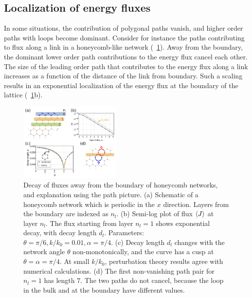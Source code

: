 \documentclass[
 preprint,
 preprintnumbers,
 amsmath,amssymb,
 aps,
 pre,
 longbibliography,
 superscriptaddress,
 10pt, twocolumn
]{revtex4-1}
\begin{document}
\subsection{Localization of energy fluxes}
In some situations, the contribution of polygonal paths vanish, and higher order paths with loops become dominant. Consider for instance the paths contributing to flux along a link in a honeycomb-like network (\figurename~\ref{fig:path_decay}). Away from the boundary, the dominant lower order path contributions to the energy flux cancel each other. The size of the leading order path that contributes to the energy flux along a link increases as a function of the distance of the link from boundary. Such a scaling results in an exponential localization of the energy flux at the boundary of the lattice (\figurename~\ref{fig:path_decay}b). 
\begin{figure}[ht]
	\centering
	\includegraphics[width=0.45\textwidth]{5_path_decay.pdf}
    \caption{Decay of fluxes away from the boundary of honeycomb networks, and explanation using the path picture.
    (a) Schematic of a honeycomb network which is periodic in the $x$ direction. Layers from the boundary are indexed as $n_l$.
    (b) Semi-log plot of flux $\expval{J}$ at layer $n_l$. The flux starting from layer $n_l=1$ shows exponential decay, with decay length $d_l$. Parameters: $\theta = \pi/6, k/k_0 = 0.01, \alpha = \pi/4$.
    (c) Decay length $d_l$ changes with the network angle $\theta$ non-monotonically, and the curve has a cusp at $\theta = \alpha = \pi/4$. At small $k/k_0$, perturbation theory results agree with numerical calculations.
    (d) The first non-vanishing path pair for $n_l=1$ has length $7$. The two paths do not cancel, because the loop in the bulk and at the boundary have different values.
    }
    \label{fig:path_decay}
\end{figure}

\end{document}
